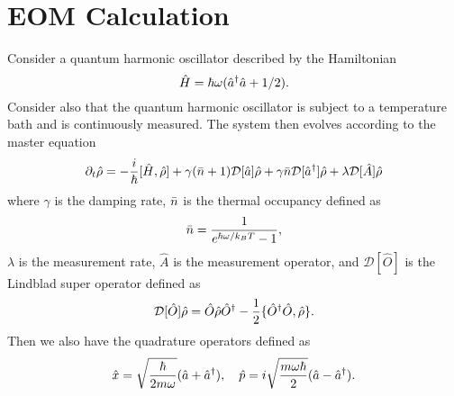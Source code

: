 \section{EOM Calculation}
Consider a quantum harmonic oscillator described by the Hamiltonian
\begin{equation}
    \hat{H} = \hbar \omega ( \hat{a}^{\dagger} \hat{a} + 1/2 ).
\end{equation}
Consider also that the quantum harmonic oscillator is subject to a temperature bath and is continuously measured. The system then evolves according to the master equation
\begin{equation}
    \partial_t \hat{\rho} = -\frac{i}{\hbar} [\hat{H}, \hat{\rho}] + \gamma (\bar{n} + 1 ) \mathcal{D}[\hat{a}] \hat{\rho} + \gamma \bar{n} \mathcal{D}[\hat{a}^{\dagger}] \hat{\rho} + \lambda \mathcal{D}[\hat{A}] \hat{\rho} \label{eq:master}
\end{equation}
where $\gamma$ is the damping rate, $\bar{n}$ is the thermal occupancy defined as 
\begin{equation}
    \bar{n} = \frac{1}{e^{\hbar \omega / k_B T} - 1},
\end{equation}
$\lambda$ is the measurement rate, $\hat{A}$ is the measurement operator, and $\mathcal{D}[\hat{O}]$ is the Lindblad super operator defined as
\begin{equation}
    \mathcal{D}[\hat{O}] \hat{\rho} = \hat{O} \hat{\rho} \hat{O}^\dagger - \frac{1}{2} \{ \hat{O}^\dagger \hat{O}, \hat{\rho} \}.
\end{equation}
Then we also have the quadrature operators defined as 
\begin{equation}
    \hat{x} = \sqrt{\frac{\hbar}{2 m \omega}} (\hat{a} + \hat{a}^{\dagger}), \quad \hat{p} = i \sqrt{\frac{m \omega \hbar}{2}} (\hat{a} - \hat{a}^{\dagger}).
\end{equation}

